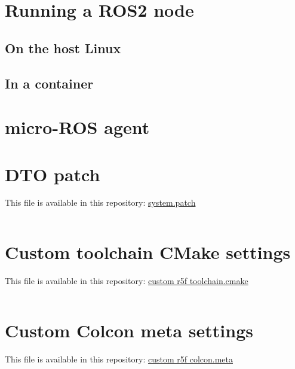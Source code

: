 \documentclass[10pt]{article}
\begin{document}
\section{Running a ROS2 node}
\label{sec:org2c7a3ee}

\subsection{On the host Linux}
\label{sec:orged040f3}

\subsection{In a container}
\label{sec:orgaea48a8}

\section{micro-ROS agent}
\label{sec:org9e9171e}

\pagebreak
\appendix
\section{DTO patch}
\label{sec:org7514221}
This file is available in this repository: \href{https://gitlab.com/sunoc/xilinx-kria-kv260-documentation/-/blob/b7300116e153f4b5a1542f8804e4646db8030033/src/system.patch}{system.patch}
\inputminted[linenos, frame=single]{diff}{./src/system.patch}

\pagebreak
\section{Custom toolchain CMake settings}
\label{sec:orgad64dbb}
This file is available in this repository: \href{https://gitlab.com/sunoc/xilinx-kria-kv260-documentation/-/blob/b7300116e153f4b5a1542f8804e4646db8030033/src/custom\_r5f\_toolchain.cmake}{custom r5f toolchain.cmake}
\inputminted[linenos, frame=single]{cmake}{./src/custom_r5f_toolchain.cmake}

\pagebreak
\section{Custom Colcon meta settings}
\label{sec:org4e01559}
This file is available in this repository: \href{https://gitlab.com/sunoc/xilinx-kria-kv260-documentation/-/blob/b7300116e153f4b5a1542f8804e4646db8030033/src/custom\_r5f\_colcon.meta}{custom r5f colcon.meta}
\inputminted[linenos, frame=single]{yaml}{./src/custom_r5f_colcon.meta}
\end{document}
